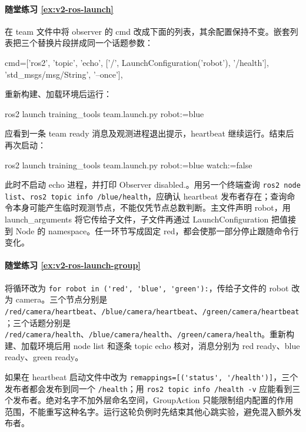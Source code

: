 \paragraph*{随堂练习 \ref{ex:v2-ros-launch}}
\begin{solution}
在 team 文件中将 observer 的 cmd 改成下面的列表，其余配置保持不变。嵌套列表把三个替换片段拼成同一个话题参数：
\begin{tpython}
cmd=['ros2', 'topic', 'echo',
     ['/', LaunchConfiguration('robot'), '/health'],
     'std_msgs/msg/String', '--once'],
\end{tpython}
重新构建、加载环境后运行：
\begin{tbash}
ros2 launch training_tools team.launch.py robot:=blue
\end{tbash}
应看到一条 team ready 消息及观测进程退出提示，heartbeat 继续运行。结束后再次启动：
\begin{tbash}
ros2 launch training_tools team.launch.py robot:=blue watch:=false
\end{tbash}
此时不启动 echo 进程，并打印 Observer disabled.。用另一个终端查询 \texttt{ros2 node list}、\texttt{ros2 topic info /blue/health}，应确认 heartbeat 发布者存在；查询命令本身可能产生临时观测节点，不能仅凭节点总数判断。主文件声明 robot，用 launch\_arguments 将它传给子文件，子文件再通过 LaunchConfiguration 把值接到 Node 的 namespace。任一环节写成固定 red，都会使那一部分停止跟随命令行变化。
\end{solution}

\paragraph*{随堂练习 \ref{ex:v2-ros-launch-group}}
\begin{solution}
将循环改为 \nolinkurl{for robot in ('red', 'blue', 'green'):}，传给子文件的 robot 改为 camera。三个节点分别是 \nolinkurl{/red/camera/heartbeat}、\nolinkurl{/blue/camera/heartbeat}、\nolinkurl{/green/camera/heartbeat}；三个话题分别是 \nolinkurl{/red/camera/health}、\nolinkurl{/blue/camera/health}、\nolinkurl{/green/camera/health}。重新构建、加载环境后用 node list 和逐条 topic echo 核对，消息分别为 red ready、blue ready、green ready。

如果在 heartbeat 启动文件中改为 \nolinkurl{remappings=[('status', '/health')]}，三个发布者都会发布到同一个 \texttt{/health}；用 \texttt{ros2 topic info /health -v} 应能看到三个发布者。绝对名字不加外层命名空间，GroupAction 只能限制组内配置的作用范围，不能重写这种名字。运行这轮负例时先结束其他心跳实验，避免混入额外发布者。
\end{solution}

